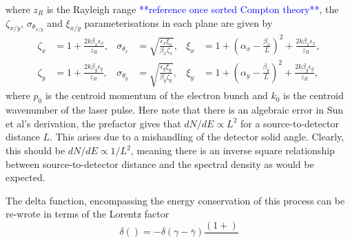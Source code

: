 \documentclass[../main.tex]{subfiles}
\begin{document}
where $z_{R}$ is the Rayleigh range \textcolor{blue}{**reference once sorted Compton theory**}, the $\zeta_{x/y}$, $\sigma_{\theta_{x/y}}$ and  $\xi_{x/y}$ parameterisations in each plane are given by
\begin{align}
\zeta_{x} &= 1+\frac{2k\beta_{x}\epsilon_{x}}{z_{R}}, & \sigma_{\theta_{x}} &= \sqrt{\frac{\epsilon_{x}\xi_{x}}{\beta_{x}\zeta_{x}}}, & \xi_{x} &= 1+\left(\alpha_{x}-\frac{\beta_{x}}{L}\right)^{2}+\frac{2k\beta_{x}\epsilon_{x}}{z_{R}}, \nonumber\\
\zeta_{y} &= 1+\frac{2k\beta_{y}\epsilon_{y}}{z_{R}}, & \sigma_{\theta_{y}} &= \sqrt{\frac{\epsilon_{y}\xi_{y}}{\beta_{y}\zeta_{y}}}, & \xi_{y} &= 1+\left(\alpha_{y}-\frac{\beta_{y}}{L}\right)^{2}+\frac{2k\beta_{y}\epsilon_{y}}{z_{R}}, 
\label{eq:zeta_sigmatheta_xi_parameters_sun}
\end{align}
where $p_{0}$ is the centroid momentum of the electron bunch and $k_{0}$ is the centroid wavenumber of the laser pulse. Here note that there is an algebraic error in Sun et al's \cite{sun2009characterizations,sun2011theoretical} derivation, the prefactor gives that $dN/dE\propto L^{2}$ for a source-to-detector distance $L$. This arises due to a mishandling of the detector solid angle. Clearly, this should be $dN/dE\propto 1/L^{2}$, meaning there is an inverse square relationship between source-to-detector distance and the spectral density as would be expected. 

The delta function, encompassing the energy conservation of this process can be re-wrote in terms of the Lorentz factor
\begin{equation}
\delta\left(\right) = -\delta\left(\gamma-\bar{\gamma}\right)\frac{\left(1+\right)}{}
\label{sun_electron_energy_delta_function}    
\end{equation}
\end{document}
